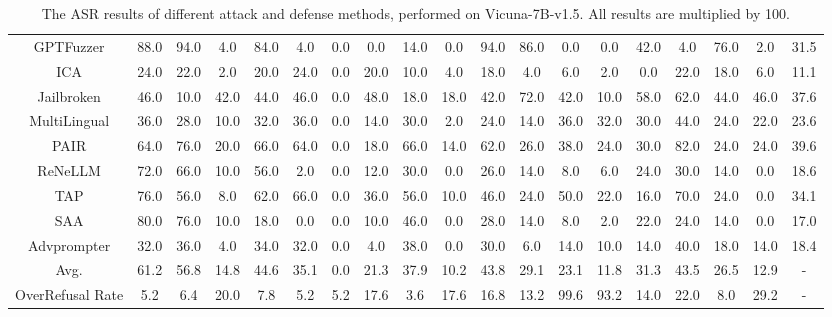\begin{table*}[!t]
{\begin{tabular}{c|c|*{17}{c}}
            GPTFuzzer      & 88.0 & 94.0 & 4.0  & 84.0 & 4.0  & 0.0 & 0.0  & 14.0 & 0.0  &  94.0   & 86.0  & 0.0  & 0.0  & 42.0 & 4.0   &     76.0    & 2.0  & 31.5 \\ 
            ICA            & 24.0 & 22.0 & 2.0 & 20.0 &	24.0 & 0.0 & 20.0 & 10.0 & 4.0 & 18.0 & 4.0 & 6.0 & 2.0 & 0.0 & 22.0 & 18.0 & 6.0 & 11.1 \\
            Jailbroken     & 46.0 & 10.0 & 42.0 & 44.0 & 46.0 & 0.0 & 48.0 & 18.0 & 18.0 &   42.0   & 72.0 & 42.0 &  10.0 & 58.0 & 62.0 &   44.0   & 46.0  & 37.6\\
            MultiLingual   & 36.0 & 28.0 & 10.0 & 32.0 & 36.0 & 0.0 & 14.0 & 30.0 & 2.0  &  24.0    & 14.0 & 36.0 &  32.0 & 30.0 & 44.0 &   24.0    & 22.0 & 23.6\\
            PAIR           & 64.0 & 76.0 & 20.0 &   66.0   & 64.0 & 0.0 & 18.0 & 66.0 & 14.0 &   62.0   & 26.0 & 38.0 &  24.0 & 30.0 & 82.0 &   24.0    & 24.0 & 39.6\\
            ReNeLLM        & 72.0 & 66.0 & 10.0 & 56.0 & 2.0  & 0.0 & 12.0 & 30.0 & 0.0  &  26.0    & 14.0 & 8.0  &  6.0  & 24.0 & 30.0 &   14.0    & 0.0 & 18.6\\
            TAP            & 76.0 & 56.0 & 8.0  & 62.0 & 66.0 & 0.0 & 36.0 & 56.0 & 10.0 &  46.0    & 24.0 & 50.0 &  22.0 & 16.0 & 70.0 &  24.0     & 0.0 & 34.1\\
            SAA            & 80.0 & 76.0 & 10.0 & 18.0 & 0.0  & 0.0 & 10.0 & 46.0 & 0.0  &   28.0   & 14.0 & 8.0  &  2.0  & 22.0 & 24.0 &   14.0    & 0.0 & 17.0\\
            Advprompter    & 32.0 & 36.0 & 4.0  & 34.0 & 32.0 & 0.0 & 4.0  & 38.0 & 0.0  &  30.0    & 6.0 & 14.0 &  10.0 & 14.0 & 40.0 &  18.0     & 14.0 & 18.4 \\
            \midrule
            Avg.         & 61.2 & 56.8 & 14.8 & 44.6 & 35.1 & 0.0 & 21.3 & 37.9 & 10.2 & 43.8 & 29.1 & 23.1 & 11.8 & 31.3 & 43.5 & 26.5  & 12.9 & - \\
            \hline
            \midrule
            OverRefusal Rate & 5.2 & 6.4 & 20.0 & 7.8 & 5.2 & 5.2 & 17.6 & 3.6 & 17.6 &  16.8    & 13.2 & 99.6 & 93.2 & 14.0 & 22.0 &   8.0   & 29.2 & - \\
            \bottomrule
        \end{tabular}
        }
    \caption{The ASR results of different attack and defense methods, performed on Vicuna-7B-v1.5. All results are multiplied by 100.}
    \label{tab:main_res}
\end{table*}